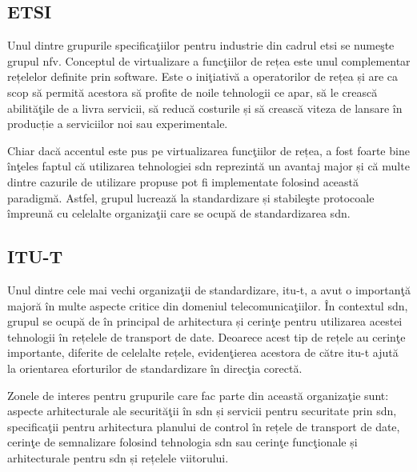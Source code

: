 \subsection{ETSI}

Unul dintre grupurile specificaţiilor pentru industrie din cadrul \gls{etsi} se numeşte grupul \gls{nfv}. Conceptul de virtualizare a funcţiilor de rețea este unul complementar rețelelor definite prin software. Este o iniţiativă a operatorilor de rețea și are ca scop să permită acestora să profite de noile tehnologii ce apar, să le crească abilităţile de a livra servicii, să reducă costurile și să crească viteza de lansare în producție a serviciilor noi sau experimentale.

Chiar dacă accentul este pus pe virtualizarea funcţiilor de rețea, a fost foarte bine înţeles faptul că utilizarea tehnologiei \gls{sdn} reprezintă un avantaj major și că multe dintre cazurile de utilizare propuse pot fi implementate folosind această paradigmă. Astfel, grupul lucrează la standardizare și stabileşte protocoale împreună cu celelalte organizaţii care se ocupă de standardizarea \gls{sdn}.

\subsection{ITU-T}

Unul dintre cele mai vechi organizaţii de standardizare, \gls{itu-t}, a avut o importanţă majoră în multe aspecte critice din domeniul telecomunicaţiilor. În contextul \gls{sdn}, grupul se ocupă de în principal de arhitectura și cerinţe pentru utilizarea acestei tehnologii în rețelele de transport de date. Deoarece acest tip de rețele au cerinţe importante, diferite de celelalte rețele, evidenţierea acestora de către \gls{itu-t} ajută la orientarea eforturilor de standardizare în direcţia corectă. 

Zonele de interes pentru grupurile care fac parte din această organizaţie sunt: aspecte arhitecturale ale securităţii în \gls{sdn} și servicii pentru securitate prin \gls{sdn}, specificaţii pentru arhitectura planului de control în rețele de transport de date, cerinţe de semnalizare folosind tehnologia \gls{sdn} sau cerinţe funcţionale și arhitecturale pentru \gls{sdn} și rețelele viitorului.
